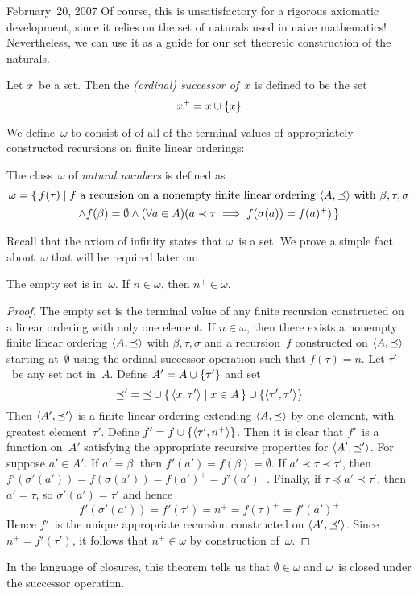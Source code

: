 \begin{lecture}{February~20, 2007}
Of course, this is unsatisfactory for a rigorous axiomatic development, since it relies on the set of naturals used in naive mathematics! Nevertheless, we can use it as a guide for our set theoretic construction of the naturals.
\begin{defn}
Let \(x\)~be a set. Then the \emph{(ordinal) successor of~\(x\)} is defined to be the set
\[x^+=x\cup\{x\}\]
\end{defn}
\noindent We define~\(\omega\) to consist of of all of the terminal values of appropriately constructed recursions on finite linear orderings:
\begin{defn}
The class~\(\omega\) of \emph{natural numbers} is defined as
\begin{multline*}
\omega=\{\,f(\tau)\mid f\text{ a recursion on a nonempty finite linear ordering }\langle{A},{\preceq}\rangle\text{ with }\beta,\tau,\sigma\\
	\land f(\beta)=\emptyset\land(\forall a\in A)(a\prec\tau\implies f(\sigma(a))=f(a)^+)\,\}
\end{multline*}
\end{defn}
\noindent Recall that the axiom of infinity states that \(\omega\)~is a set. We prove a simple fact about~\(\omega\) that will be required later on:
\begin{thm}
The empty set is in~\(\omega\). If \(n\in\omega\), then \(n^+\in\omega\).
\end{thm}
\begin{proof}
The empty set is the terminal value of any finite recursion constructed on a linear ordering with only one element. If \(n\in\omega\), then there exists a nonempty finite linear ordering \(\langle{A},{\preceq}\rangle\) with \(\beta,\tau,\sigma\) and a recursion~\(f\) constructed on \(\langle{A},{\preceq}\rangle\) starting at~\(\emptyset\) using the ordinal successor operation such that \(f(\tau)=n\). Let \(\tau'\)~be any set not in~\(A\). Define \(A'=A\cup\{\tau'\}\) and set
\[{\preceq}'={\preceq}\cup\{\,\langle{x},{\tau'}\rangle\mid x\in A\,\}\cup\{\langle{\tau'},{\tau'}\rangle\}\]
Then \(\langle{A'},{\preceq'}\rangle\) is a finite linear ordering extending \(\langle{A},{\preceq}\rangle\) by one element, with greatest element~\(\tau'\). Define \(f'=f\cup\{\langle{\tau'},{n^+}\rangle\}\). Then it is clear that \(f'\)~is a function on~\(A'\) satisfying the appropriate recursive properties for \(\langle{A'},{\preceq'}\rangle\). For suppose \(a'\in A'\). If \(a'=\beta\), then \(f'(a')=f(\beta)=\emptyset\). If \(a'\prec\tau\prec\tau'\), then \(f'(\sigma'(a'))=f(\sigma(a'))=f(a')^+=f'(a')^+\). Finally, if \(\tau\preceq a'\prec\tau'\), then \(a'=\tau\), so \(\sigma'(a')=\tau'\) and hence
\[f'(\sigma'(a'))=f'(\tau')=n^+=f(\tau)^+=f'(a')^+\]
Hence \(f'\)~is the unique appropriate recursion constructed on \(\langle{A'},{\preceq'}\rangle\). Since \(n^+=f'(\tau')\), it follows that \(n^+\in\omega\) by construction of~\(\omega\).
\end{proof}
\noindent In the language of closures, this theorem tells us that \(\emptyset\in\omega\) and \(\omega\)~is closed under the successor operation.
\end{lecture}

